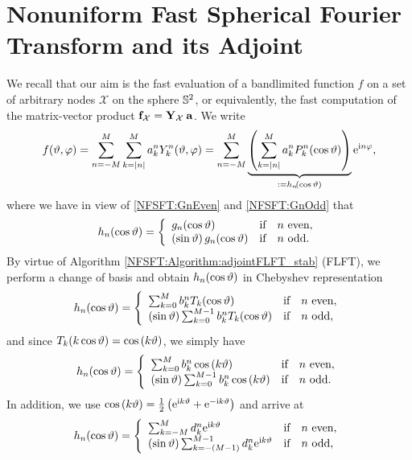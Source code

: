 \section{Nonuniform Fast Spherical Fourier Transform and its Adjoint}
\label{NFSFT:NFSFT}
We recall that our aim is the fast evaluation of a bandlimited function $f$ on a set of arbitrary nodes $\mathcal{X}$ on 
the sphere $\mathbb{S}^2$, or equivalently, the fast computation of the matrix-vector product 
$\mathbf{f}_{\mathcal{X}} = \mathbf{Y}_{\mathcal{X}} \: \mathbf{a}$. We write
\begin{equation}
  \label{NFSFT:f}
  f{\hspace{-0.4ex}}\left(\vartheta,\varphi\right) = \sum_{n=-M}^M \sum_{k=\left\vert n\right\vert}^M a_k^n Y_{k}^n{\hspace{-0.4ex}}\left(\vartheta,\varphi\right) = 
  \sum_{n=-M}^M \underbrace{\left(\sum_{k=\left\vert n\right\vert}^M a_k^n P_{k}^n{\hspace{-0.4ex}}\left(\cos\vartheta\right)\right)}_{:= h_{n}{\hspace{-0.4ex}}\left(\cos\vartheta\right)} \mbox{\rm{e}}^{\mbox{\scriptsize\rm{i}} n \varphi},
\end{equation}
where we have in view of \eqref{NFSFT:GnEven} and \eqref{NFSFT:GnOdd} that
\[
  \fun{h_{n}}{\cos\vtheta} = 
    \left\{\begin{array}{l@{\quad \text{if} \quad}l}
      \fun{g_{n}}{\cos\vtheta} & n \text{ even},\\
      \paren{\sin \vtheta} \fun{g_{n}}{\cos \vtheta} & n \text{ odd}.
    \end{array}\right. 
\]
By virtue of Algorithm \ref{NFSFT:Algorithm:adjointFLFT_stab} (FLFT), we perform a change of basis 
and obtain $h_{n}{\hspace{-0.4ex}}\left(\cos\vartheta\right)$ in Chebyshev representation
\[
  \fun{h_{n}}{\cos\vtheta} = 
    \left\{\begin{array}{l@{\quad \text{if} \quad}l}
      \sum_{k=0}^{M} b_{k}^n \fun{T_{k}}{\cos\vtheta} & n \text{ even},\\
      \paren{\sin \vtheta}\sum_{k=0}^{M-1} b_{k}^n \fun{T_{k}}{\cos\vtheta} & n \text{ odd},
    \end{array}\right. 
\]
and since $T_{k}{\hspace{-0.4ex}}\left(k \cos \vartheta\right) = \cos{\hspace{-0.4ex}}\left(k \vartheta\right)$, we simply have
\[
  \fun{h_{n}}{\cos\vtheta} = 
    \left\{\begin{array}{l@{\quad \text{if} \quad}l}
      \sum_{k=0}^{M} b_{k}^n \fun{\cos}{k \vtheta} & n \text{ even},\\
      \paren{\sin \vtheta}\sum_{k=0}^{M-1} b_{k}^n \fun{\cos}{k \vtheta} & n \text{ odd}.
    \end{array}\right. 
\]
In addition, we use $\cos{\hspace{-0.4ex}}\left(k \vartheta\right) = \frac{1}{2} \left(\mbox{\rm{e}}^{\mbox{\scriptsize\rm{i}} k \vartheta} + \mbox{\rm{e}}^{-\mbox{\scriptsize\rm{i}} k \vartheta}\right)$ 
and arrive at
\[
  \fun{h_{n}}{\cos\vtheta} = 
    \left\{\begin{array}{l@{\quad \text{if} \quad}l}
      \sum_{k=-M}^{M} d_{k}^n \e^{\im k \vtheta} & n \text{ even},\\
      \paren{\sin \vtheta} \sum_{k=-(M-1)}^{M-1} d_{k}^n \e^{\im k \vtheta} & n \text{ odd},
    \end{array}\right. 
\]
